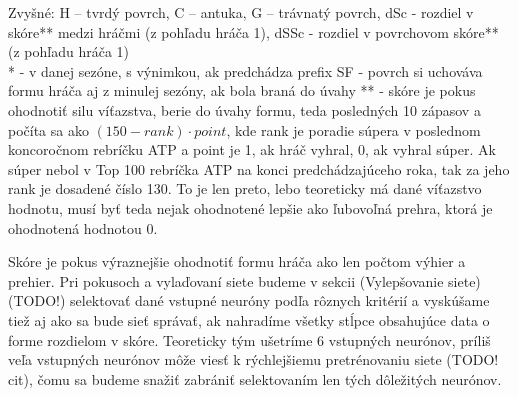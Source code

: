 Zvyšné: H -- tvrdý povrch, C -- antuka, G -- trávnatý povrch, dSc - rozdiel v skóre** medzi hráčmi (z pohľadu hráča 1), dSSc - rozdiel v povrchovom skóre** (z pohľadu hráča 1)\\
* - v danej sezóne, s výnimkou, ak predchádza prefix SF - povrch si uchováva formu hráča aj z minulej sezóny, ak bola braná do úvahy
** - skóre je pokus ohodnotiť silu víťazstva, berie do úvahy formu, teda posledných 10 zápasov a počíta sa ako $(150 - rank)\cdot point$, kde rank je poradie súpera v poslednom koncoročnom rebríčku ATP a point je 1, ak hráč vyhral, 0, ak vyhral súper. 
Ak súper nebol v Top 100 rebríčka ATP na konci predchádzajúceho roka, tak za jeho rank je dosadené číslo 130.
To je len preto, lebo teoreticky má dané víťazstvo hodnotu, musí byť teda nejak ohodnotené lepšie ako ľubovoľná prehra, ktorá je ohodnotená hodnotou 0.
\fi

Skóre je pokus výraznejšie ohodnotiť formu hráča ako len počtom výhier a prehier. Pri pokusoch a vylaďovaní siete budeme v sekcii (Vylepšovanie siete) (TODO!) selektovať dané vstupné neuróny podľa rôznych kritérií a vyskúšame tiež aj ako sa bude sieť správať, ak nahradíme všetky stĺpce obsahujúce data o forme rozdielom v skóre.
Teoreticky tým ušetríme 6 vstupných neurónov, príliš veľa vstupných neurónov môže viesť k rýchlejšiemu pretrénovaniu siete (TODO! cit), čomu sa budeme snažiť zabrániť selektovaním len tých dôležitých neurónov.